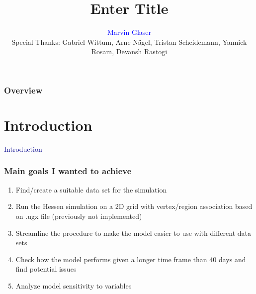 \documentclass{beamer}
\title[Other thing]{Enter Title}
\author{\textcolor{blue}{Marvin Glaser\\}
\vspace{2mm}\footnotesize{Special Thanks: Gabriel Wittum, Arne N\"agel, Tristan Scheidemann, Yannick Rosam, Devansh Rastogi}} %
\institute[G-CSC] %
{
Goethe Universtiy Frankfurt - Center for Scientific Computing \\ %
\medskip
}
\begin{document}



\begin{frame}
\frametitle{Overview} 
\tableofcontents 
\end{frame}



\section{Introduction}
\begin{frame}
	\centering
	\textcolor{darkblue}{\huge{Introduction}}
\end{frame}

\begin{frame}
	\frametitle{Main goals I wanted to achieve}
	\vspace{-1.0cm}
	\begin{enumerate}[$\bullet$]
		\item Find/create a suitable data set for the simulation
		\item Run the Hessen simulation on a 2D grid with vertex/region association based on .ugx file (previously not implemented)
		\item Streamline the procedure to make the model easier to use with different data sets
		\item Check how the model performs given a longer time frame than 40 days and find potential issues
		\item Analyze model sensitivity to variables
	\end{enumerate}
\end{frame}
\end{document}
